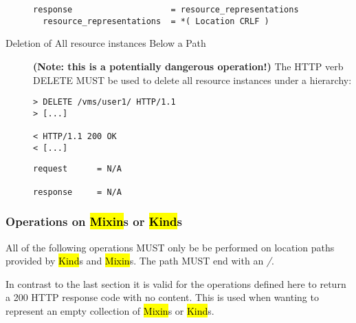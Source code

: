 \documentclass[10pt,a4paper]{article}
\begin{document}
\begin{description}
\begin{verbatim}
response                    = resource_representations
  resource_representations  = *( Location CRLF ) 
\end{verbatim}

  \item[Deletion of All resource instances Below a Path]
    \textbf{(Note: this is a potentially dangerous operation!)} The
    HTTP verb DELETE MUST be used to delete all resource instances
    under a hierarchy:
\begin{verbatim}
> DELETE /vms/user1/ HTTP/1.1
> [...]
 
< HTTP/1.1 200 OK
< [...]
\end{verbatim}

\begin{verbatim}
request      = N/A

response     = N/A
\end{verbatim}

\end{description}

\subsubsection{Operations on \hl{Mixin}s or \hl{Kind}s}
\label{sec:mixin_and_kind_operations}
All of the following operations MUST only be be performed on location
paths provided by \hl{Kind}s and \hl{Mixin}s. The path MUST end with
an \emph{/}.

In contrast to the last section it is valid for the operations defined
here to return a 200 HTTP response code with no content. This is used
when wanting to represent an empty collection of \hl{Mixin}s or
\hl{Kind}s.
\end{document}
